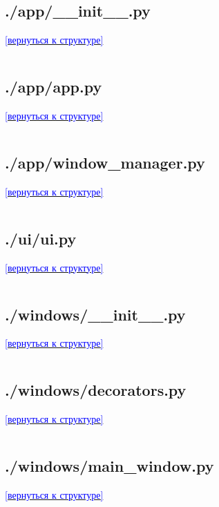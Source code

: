 \label{sec:app_init}
\subsection*{./app/\_\_init\_\_.py}
\noindent\hyperref[sec:appendix]{\textcolor{blue}{[вернуться к структуре]}}
\inputminted{python}{../app/__init__.py}

\label{sec:app_app}
\subsection*{./app/app.py}
\noindent\hyperref[sec:appendix]{\textcolor{blue}{[вернуться к структуре]}}
\inputminted{python}{../app/app.py}

\label{sec:app_window_manager}
\subsection*{./app/window\_manager.py}
\noindent\hyperref[sec:appendix]{\textcolor{blue}{[вернуться к структуре]}}
\inputminted{python}{../app/window_manager.py}

\label{sec:ui_ui}
\subsection*{./ui/ui.py}
\noindent\hyperref[sec:appendix]{\textcolor{blue}{[вернуться к структуре]}}
\inputminted{python}{../ui/ui.py}

\label{sec:windows_init}
\subsection*{./windows/\_\_init\_\_.py}
\noindent\hyperref[sec:appendix]{\textcolor{blue}{[вернуться к структуре]}}
\inputminted{python}{../windows/__init__.py}

\label{sec:windows_decorators}
\subsection*{./windows/decorators.py}
\noindent\hyperref[sec:appendix]{\textcolor{blue}{[вернуться к структуре]}}
\inputminted{python}{../windows/decorators.py}

\label{sec:windows_main_window}
\subsection*{./windows/main\_window.py}
\noindent\hyperref[sec:appendix]{\textcolor{blue}{[вернуться к структуре]}}
\inputminted{python}{../windows/main_window.py}


